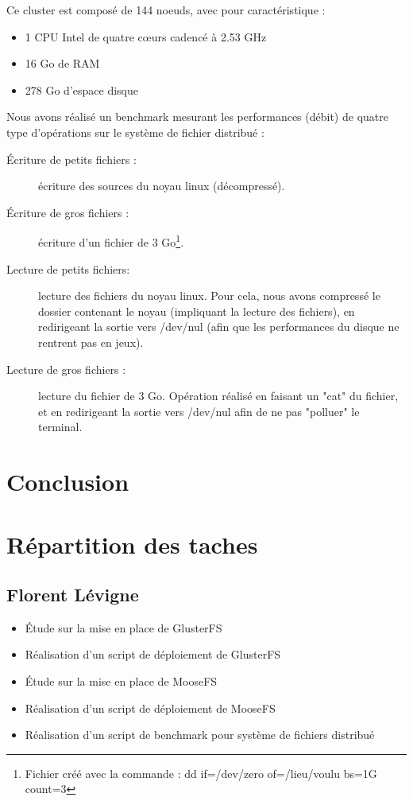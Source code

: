 \documentclass[12pt]{report}
\begin{document}
			Ce cluster est composé de 144 noeuds, avec pour caractéristique :
			\begin{itemize}
				\item 1 CPU Intel de quatre cœurs cadencé à 2.53 GHz
				\item 16 Go de RAM
				\item 278 Go d'espace disque\\
			\end{itemize}

			Nous avons réalisé un benchmark mesurant les performances (débit) de quatre type d'opérations sur le système de fichier distribué :
			\begin{description}
				\item[Écriture de petits fichiers :] écriture des sources du noyau linux (décompressé).
				\item[Écriture de gros fichiers :] écriture d'un fichier de 3 Go\footnote{Fichier créé avec la commande : dd if=/dev/zero of=/lieu/voulu bs=1G count=3}.
				\item[Lecture de petits fichiers: ] lecture des fichiers du noyau linux.
				Pour cela, nous avons compressé le dossier contenant le noyau (impliquant la lecture des fichiers),
				en redirigeant la sortie vers /dev/nul (afin que les performances du disque ne rentrent pas en jeux).
				\item[Lecture de gros fichiers :] lecture du fichier de 3 Go. Opération réalisé en faisant un "cat" du fichier,
				et en redirigeant la sortie vers /dev/nul afin de ne pas "polluer" le terminal.
			\end{description}


	\chapter{Conclusion}

	\appendix
		\chapter{Répartition des taches}
			\section{Florent Lévigne}
				\begin{itemize}
					\item Étude sur la mise en place de GlusterFS
					\item Réalisation d'un script de déploiement de GlusterFS
					\item Étude sur la mise en place de MooseFS
					\item Réalisation d'un script de déploiement de MooseFS
					\item Réalisation d'un script de benchmark pour système de fichiers distribué
				\end{itemize}
\end{document}
